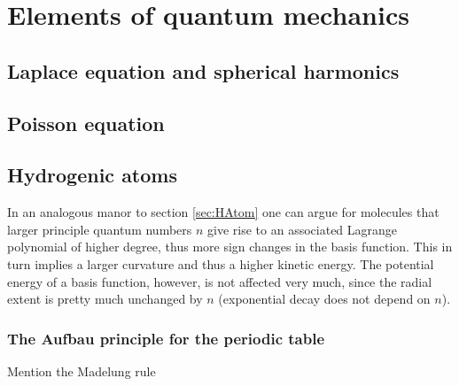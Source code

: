 \chapter{Elements of quantum mechanics}

\section{Laplace equation and spherical harmonics}

\section{Poisson equation}

\section{Hydrogenic atoms}
\label{sec:HAtom}


In an analogous manor to section \vref{sec:HAtom}
one can argue for molecules that larger principle quantum numbers
$n$ give rise to an associated Lagrange polynomial of higher degree,
thus more sign changes in the basis function.
This in turn implies a larger curvature and thus a higher kinetic energy.
The potential energy of a basis function, however,
is not affected very much,
since the radial extent is pretty much unchanged by $n$
(exponential decay does not depend on $n$).


\subsection{The Aufbau principle for the periodic table}
\label{sec:PSEAufbau}
Mention the Madelung rule


